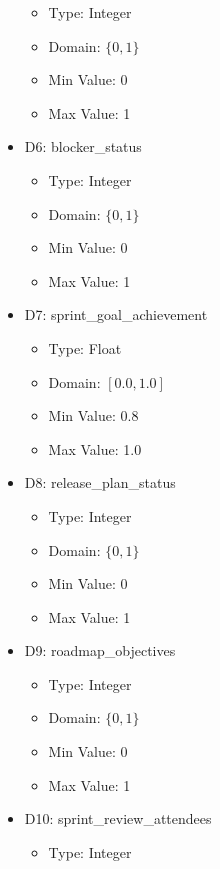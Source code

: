 \documentclass{article}
\begin{document}
\begin{itemize}
        \begin{itemize}
            \item Type: Integer
            \item Domain: $\{0, 1\}$
            \item Min Value: 0
            \item Max Value: 1
        \end{itemize}
    \item D6: blocker\_status
        \begin{itemize}
            \item Type: Integer
            \item Domain: $\{0, 1\}$
            \item Min Value: 0
            \item Max Value: 1
        \end{itemize}
    \item D7: sprint\_goal\_achievement
        \begin{itemize}
            \item Type: Float
            \item Domain: $[0.0, 1.0]$
            \item Min Value: 0.8
            \item Max Value: 1.0
        \end{itemize}
    \item D8: release\_plan\_status
        \begin{itemize}
            \item Type: Integer
            \item Domain: $\{0, 1\}$
            \item Min Value: 0
            \item Max Value: 1
        \end{itemize}
    \item D9: roadmap\_objectives
        \begin{itemize}
            \item Type: Integer
            \item Domain: $\{0, 1\}$
            \item Min Value: 0
            \item Max Value: 1
        \end{itemize}
    \item D10: sprint\_review\_attendees
        \begin{itemize}
            \item Type: Integer

\end{itemize}
\end{itemize}
\end{document}
